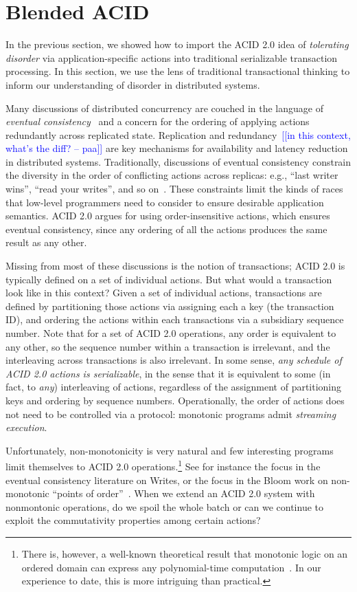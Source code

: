 \documentclass{sig-alternate}
\newcommand{\paa}[1]{{\textcolor{blue}{[[#1 -- paa]]}}}
\begin{document}
\section{Blended ACID}
In the previous section, we showed how to import the ACID 2.0 idea of
\emph{tolerating disorder} via application-specific actions into traditional
serializable transaction processing. In this section, we use the lens of
traditional transactional thinking to inform our understanding of disorder in
distributed systems.

Many discussions of distributed concurrency are couched in the language of
\emph{eventual consistency}~\cite{Terry1995} and a concern for the ordering of
applying actions redundantly across replicated state.  Replication and
redundancy~\paa{in this context, what's the diff?} are key mechanisms for availability and latency reduction in
distributed systems.  Traditionally, discussions of eventual consistency
constrain the diversity in the order of conflicting actions across replicas:
e.g., ``last writer wins'', ``read your writes'', and so on~\cite{Terry1994}.
These constraints limit the kinds of races that low-level programmers need to
consider to ensure desirable application semantics.  ACID 2.0 argues for using
order-insensitive actions, which ensures eventual consistency, since any
ordering of all the actions produces the same result as any other.

Missing from most of these discussions is the notion of transactions; ACID 2.0
is typically defined on a set of individual actions.  But what would a
transaction look like in this context?  Given a set of individual actions,
transactions are defined by partitioning those actions via assigning each a key
(the transaction ID), and ordering the actions within each transactions via a
subsidiary sequence number.  Note that for a set of ACID 2.0 operations, any
order is equivalent to any other, so the sequence number within a transaction is
irrelevant, and the interleaving across transactions is also irrelevant.  In
some sense, \emph{any schedule of ACID 2.0 actions is serializable}, in the
sense that it is equivalent to some (in fact, to \emph{any}) interleaving of
actions, regardless of the assignment of partitioning keys and ordering by
sequence numbers.  Operationally, the order of actions does not need to be
controlled via a protocol: monotonic programs admit \emph{streaming execution}.

Unfortunately, non-monotonicity is very natural and few interesting programs
limit themselves to ACID 2.0 operations.\footnote{There is, however, a
  well-known theoretical result that monotonic logic on an ordered domain can express
  any polynomial-time computation~\cite{immerman-ptime}.  In our experience to
  date, this is more intriguing than practical.}  See for instance the focus in
the eventual consistency literature on Writes, or the focus in the Bloom work on
non-monotonic ``points of order''~\cite{Alvaro2011}.
When we extend an ACID 2.0 system with nonmontonic operations, do we spoil the whole batch
or can we continue to exploit the commutativity properties among certain actions?
\end{document}
